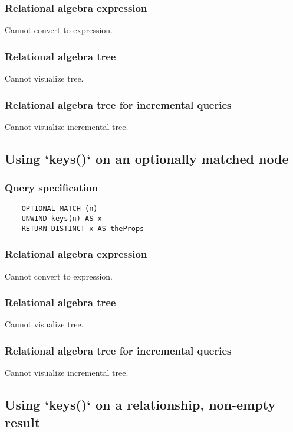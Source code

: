 	\subsubsection*{Relational algebra expression}

	Cannot convert to expression.

	\subsubsection*{Relational algebra tree}

	Cannot visualize tree.

	\subsubsection*{Relational algebra tree for incremental queries}

	Cannot visualize incremental tree.
	\subsection{Using `keys()` on an optionally matched node}

	\subsubsection*{Query specification}

	\begin{lstlisting}
	OPTIONAL MATCH (n)
	UNWIND keys(n) AS x
	RETURN DISTINCT x AS theProps
	\end{lstlisting}


	\subsubsection*{Relational algebra expression}

	Cannot convert to expression.

	\subsubsection*{Relational algebra tree}

	Cannot visualize tree.

	\subsubsection*{Relational algebra tree for incremental queries}

	Cannot visualize incremental tree.
	\subsection{Using `keys()` on a relationship, non-empty result}


